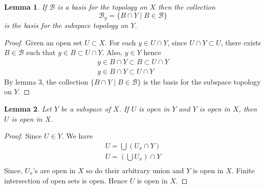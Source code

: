 \documentclass[12pt,reqno]{amsart}
\theoremstyle{plain}
\newtheorem{lem}{Lemma}
\theoremstyle{definition}
\newcommand{\cal}[1]{\mathcal{#1}}
\begin{document}
\begin{lem}
    If $\cal B$ is a basis for the topology on $X$ then the collection 
    $$ \cal B_y = \{ B \cap Y \mid B \in \cal B\}$$
    is the basis for the subspace topology on $Y$.    
\end{lem}
\begin{proof}
    Given an open set $U \subset X$. For each $y \in U \cap Y$, since $U \cap Y \subset U$, there exists $B \in \cal B$ such that $y \in B \subset U \cap Y$. Also, $y \in Y$ hence
    $$
    \begin{array}{l}
        y \in B \cap Y \subset B \subset U \cap Y \\
        y \in B \cap Y \subset U \cap Y        
    \end{array} 
    $$
    By lemma $3$, the collection $\{B \cap Y \mid B \in \cal B\}$ is the basis for the subspace topology on $Y$.
\end{proof}
\begin{lem}
    Let $Y$ be a subspace of $X$. If $U$ is open in $Y$ and $Y$ is open in $X$, then $U$ is open in $X$.
\end{lem}
\begin{proof}
    Since $U \in Y$. We have 
    $$
    \begin{array}{l}
        U = \bigcup (U_x \cap Y) \\
        U = (\bigcup U_x) \cap Y \\        
    \end{array}
    $$
    Since, $U_x$'s are open in $X$ so do their arbitrary union and $Y$ is open in $X$. Finite intersection of open sets is open. Hence $U$ is open in $X$.
\end{proof}
\end{document}
